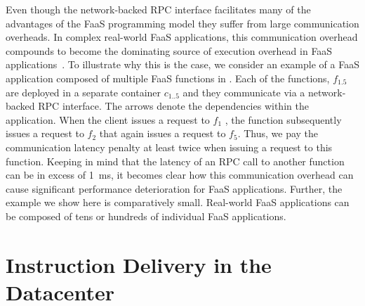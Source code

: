 \documentclass[../main.tex]{subfiles}
\begin{document}
\begin{refsection}
Even though the network-backed RPC interface facilitates many of the
advantages of the FaaS programming model they suffer from large
communication overheads. In complex real-world FaaS applications, this
communication overhead compounds to become the dominating source of
execution overhead in FaaS
applications~\cite{stellar,gan19_open_sourc_bench_suite_micros}. To
illustrate why this is the case, we consider an example of a FaaS
application composed of multiple FaaS functions in
. Each of the functions, $f_{1.5}$ are deployed in
a separate container $c_{1..5}$ and they communicate via a
network-backed RPC interface. The arrows denote the dependencies
within the application. When the client issues a request to $f_1$ ,
the function subsequently issues a request to $f_2$ that again issues
a request to $f_5$. Thus, we pay the communication latency penalty at
least twice when issuing a request to this function. Keeping in mind
that the latency of an RPC call to another function can be in excess
of 1~ms, it becomes clear how this communication overhead can cause
significant performance deterioration for FaaS applications. Further,
the example we show here is comparatively small. Real-world FaaS
applications can be composed of tens or hundreds of individual FaaS
applications.




\section{Instruction Delivery in the Datacenter}
\label{sec:instr-delivery}

\label{sec:btb-background}



\end{refsection}
\end{document}
